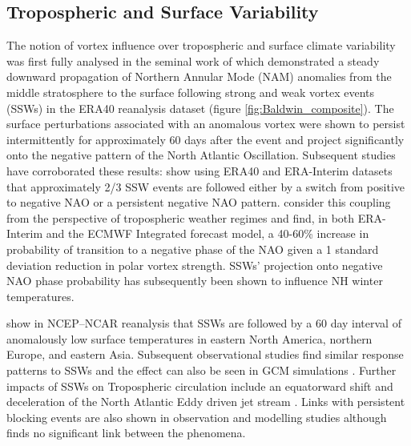 {\subsection{Tropospheric and Surface Variability}
The notion of vortex influence over tropospheric and surface climate variability was first fully analysed in the seminal work of \cite{baldwinStratospheric2001a} which demonstrated a steady downward propagation of Northern Annular Mode (NAM) anomalies from the middle stratosphere to the surface following strong and weak vortex events (SSWs) in the ERA40 reanalysis dataset (figure \ref{fig:Baldwin_composite}). The surface perturbations associated with an anomalous vortex were shown to persist intermittently for approximately 60 days after the event and project significantly onto the negative pattern of the North Atlantic Oscillation. Subsequent studies have corroborated these results: \cite{domeisenEstimating2019} show using ERA40 and ERA-Interim datasets that approximately 2/3 SSW events are followed either by a switch from positive to negative NAO or a persistent negative NAO pattern. \cite{charlton-perezInfluence2018a} consider this coupling from the perspective of tropospheric weather regimes and find, in both ERA-Interim and the ECMWF Integrated forecast model, a 40-60\% increase in probability of transition to a negative phase of the NAO given a 1 standard deviation reduction in polar vortex strength. SSWs' projection onto negative NAO phase probability has subsequently been shown to influence NH winter temperatures.

\cite{thompsonStratospheric2002} show in NCEP–NCAR reanalysis that SSWs are followed by a 60 day interval of anomalously low surface temperatures in eastern North America, northern Europe, and eastern Asia. Subsequent observational studies find similar response patterns to SSWs \citep{kolstadAssociation2010, kingObserved2019, lehtonenObserved2016} and the effect can also be seen in GCM simulations \citep{tomassiniRole2012, lehtonenObserved2016}. Further impacts of SSWs on Tropospheric circulation include an equatorward shift and deceleration of the North Atlantic Eddy driven jet stream \citep{hitchcockDownward2014,maycockRegime2020}. Links with persistent blocking events are also shown in observation and modelling studies \citep{daviniBlocking2014, vialSudden2013} although \cite{taguchiThere2008} finds no significant link between the phenomena.

}
